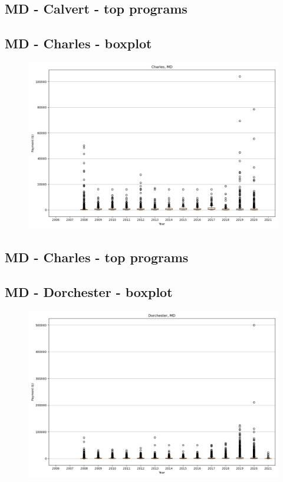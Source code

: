 \subsection*{MD - Calvert - top programs}

\newpage
\subsection*{MD - Charles - boxplot}
\begin{figure}[h]
\centering
\includegraphics[width=7in]{../output/boxplots/counties/Charles-MD_boxplot.png}
\end{figure}


\subsection*{MD - Charles - top programs}

\newpage
\subsection*{MD - Dorchester - boxplot}
\begin{figure}[h]
\centering
\includegraphics[width=7in]{../output/boxplots/counties/Dorchester-MD_boxplot.png}
\end{figure}


